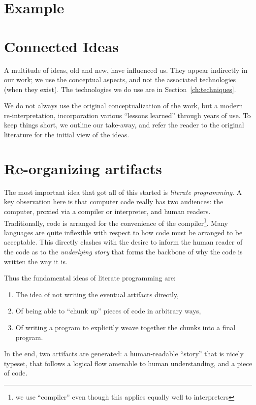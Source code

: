 \documentclass[sigconf,review]{acmart}
\begin{document}
\section{Example}\label{ch:example}

\section{Connected Ideas}\label{ch:ideas}

A multitude of ideas, old and new, have influenced us. They appear
indirectly in our work; we use the conceptual aspects, and not the
associated technologies (when they exist). The technologies we do use
are in Section~\ref{ch:techniques}.

We do not always use the original conceptualization of the work, but
a modern re-interpretation, incorporation various ``lessons learned''
through years of use. To keep things short, we outline our take-away, and refer
the reader to the original literature for the initial view of the ideas.

\section{Re-organizing artifacts}

The most important idea that got all of this started is
\emph{literate programming}\cite{Knuth1984}. A key observation here
is that computer code really has two audiences: the computer, proxied
via a compiler or interpreter, and human readers. Traditionally, code
is arranged for the convenience of the compiler\footnote{we use ``compiler''
even though this applies equally well to interpreters}. Many languages
are quite inflexible with respect to how code must be arranged to be
acceptable. This directly clashes with the desire to inform the
human reader of the code as to the \emph{underlying story} that forms the
backbone of why the code is written the way it is.

Thus the fundamental ideas of literate programming are:
\begin{enumerate}
\item The idea of not writing the eventual artifacts directly,
\item Of being able to ``chunk up'' pieces of code in arbitrary
ways,
\item Of writing a program to explicitly weave together the chunks
into a final program.
\end{enumerate}
In the end, two artifacts are generated: a human-readable ``story'' that
is nicely typeset, that follows a logical flow amenable to human understanding,
and a piece of code.
\end{document}
